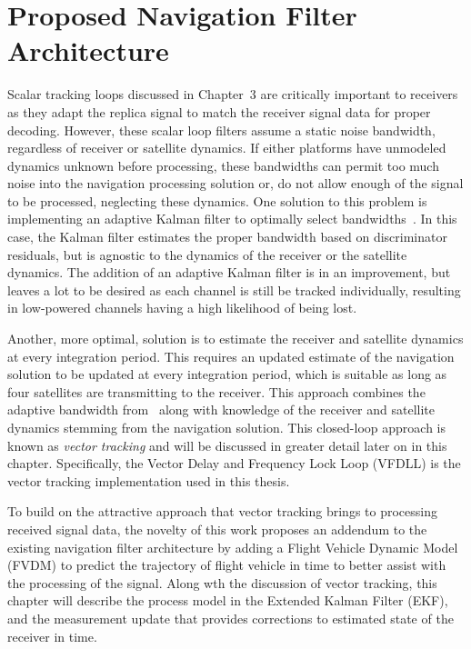 \chapter{Proposed Navigation Filter Architecture}
Scalar tracking loops discussed in Chapter~3 are critically important to receivers as they adapt the replica signal to match the receiver signal data for proper decoding. However, these scalar loop filters assume a static noise bandwidth, regardless of receiver or satellite dynamics. If either platforms have unmodeled dynamics unknown before processing, these bandwidths can permit too much noise into the navigation processing solution or, do not allow enough of the signal to be processed, neglecting these dynamics. One solution to this problem is implementing an adaptive Kalman filter to optimally select bandwidths~\cite{}. In this case, the Kalman filter estimates the proper bandwidth based on discriminator residuals, but is agnostic to the dynamics of the receiver or the satellite dynamics. The addition of an adaptive Kalman filter is in an improvement, but leaves a lot to be desired as each channel is still be tracked individually, resulting in low-powered channels having a high likelihood of being lost.

Another, more optimal, solution is to estimate the receiver and satellite dynamics at every integration period. This requires an updated estimate of the navigation solution to be updated at every integration period, which is suitable as long as four satellites are transmitting to the receiver. This approach combines the adaptive bandwidth from~\cite{} along with knowledge of the receiver and satellite dynamics stemming from the navigation solution. This closed-loop approach is known as \textit{vector tracking} and will be discussed in greater detail later on in this chapter. Specifically, the Vector Delay and Frequency Lock Loop (VFDLL) is the vector tracking implementation used in this thesis.

To build on the attractive approach that vector tracking brings to processing received signal data, the novelty of this work proposes an addendum to the existing navigation filter architecture by adding a Flight Vehicle Dynamic Model (FVDM) to predict the trajectory of flight vehicle in time to better assist with the processing of the signal. Along wth the discussion of vector tracking, this chapter will describe the process model in the Extended Kalman Filter (EKF), and the measurement update that provides corrections to estimated state of the receiver in time.
